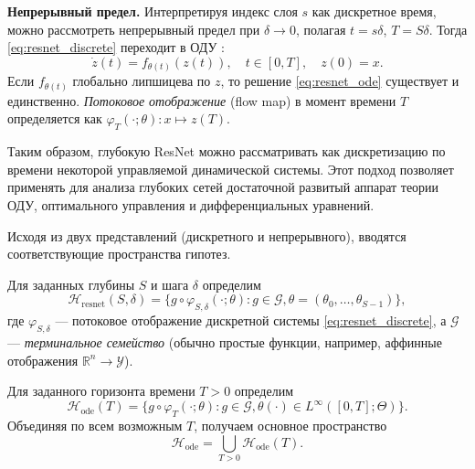 \documentclass[../NDCNNAI_main.tex]{subfiles}
\begin{document}
\textbf{Непрерывный предел.} Интерпретируя индекс слоя $s$ как дискретное время, можно рассмотреть непрерывный предел при $\delta \to 0$, полагая $t = s\delta$, $T = S\delta$. Тогда \eqref{eq:resnet_discrete} переходит в ОДУ \cite[Раздел 1.3]{Li2023DeepLD}:
\begin{equation}
\label{eq:resnet_ode}
\dot{z}(t) = f_{\theta(t)}(z(t)), \quad t \in [0, T], \quad z(0) = x.
\end{equation}
Если $f_{\theta(t)}$ глобально липшицева по $z$, то решение \eqref{eq:resnet_ode} существует и единственно. \emph{Потоковое отображение} (flow map) в момент времени $T$ определяется как $\varphi_T(\cdot; \theta): x \mapsto z(T)$.

Таким образом, глубокую ResNet можно рассматривать как дискретизацию по времени некоторой управляемой динамической системы. Этот подход позволяет применять для анализа глубоких сетей достаточной развитый аппарат теории ОДУ, оптимального управления и дифференциальных уравнений.

Исходя из двух представлений (дискретного и непрерывного), вводятся соответствующие пространства гипотез.

\begin{definition}
Для заданных глубины $S$ и шага $\delta$ определим
\begin{equation*}
\mathcal{H}_{\text{resnet}}(S,\delta) = \{ g \circ \varphi_{S,\delta}(\cdot; \theta) : g \in \mathcal{G}, \theta = (\theta_0, \ldots, \theta_{S-1}) \},
\end{equation*}
где $\varphi_{S,\delta}$ --- потоковое отображение дискретной системы \eqref{eq:resnet_discrete}, а $\mathcal{G}$ --- \emph{терминальное семейство} (обычно простые функции, например, аффинные отображения $\mathbb{R}^n \to \mathcal{Y}$).
\end{definition}

\begin{definition}
Для заданного горизонта времени $T > 0$ определим
\begin{equation*}
\mathcal{H}_{\text{ode}}(T) = \{ g \circ \varphi_T(\cdot; \theta) : g \in \mathcal{G}, \theta(\cdot) \in L^{\infty}([0, T]; \Theta) \}.
\end{equation*}
Объединяя по всем возможным $T$, получаем основное пространство
\begin{equation*}
\mathcal{H}_{\text{ode}} = \bigcup_{T > 0} \mathcal{H}_{\text{ode}}(T).
\end{equation*}
\end{definition}
\end{document}
